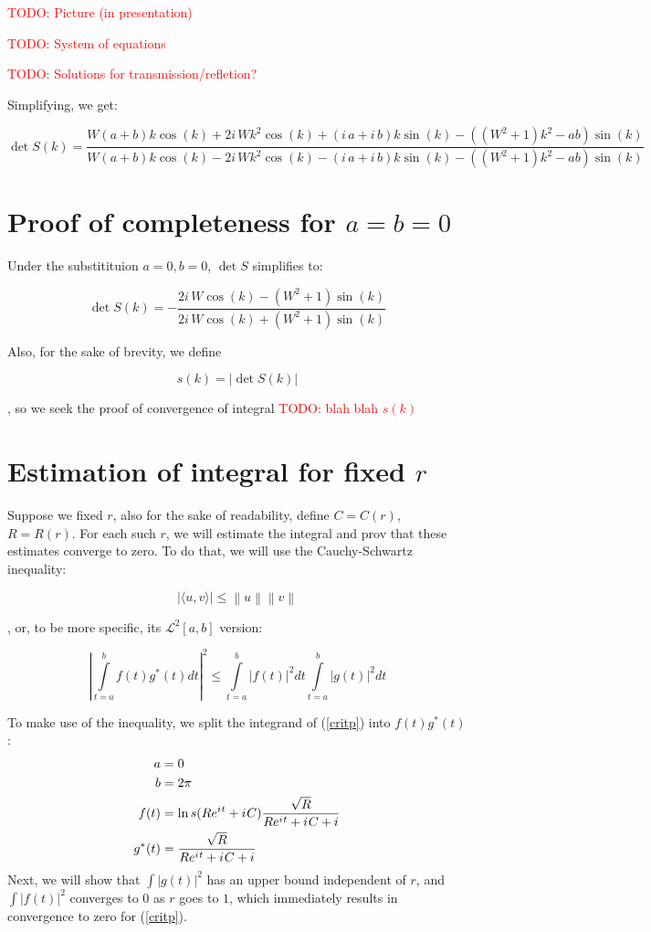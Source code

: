 \documentclass[12pt, a4paper]{article}
\newcommand{\abs}[1]{\left| #1 \right|}
\newcommand{\mcL}{\mathcal{L}}
\newcommand{\eexp}[1]{e^{#1}}
\newcommand{\iu}{{i\mkern1mu}}
\newcommand{\todo}[1]{{\large \textcolor{red}{TODO: #1}}}
\begin{document}
\todo{Picture (in presentation)}

\todo{System of equations}

\todo{Solutions for transmission/refletion?}

Simplifying, we get:

\[
\det S(k) = \frac{W {\left(a + b\right)} k \cos\left(k\right) + 2 i \, W k^{2} \cos\left(k\right) + {\left(i \, a + i \, b\right)} k \sin\left(k\right) - {\left({\left(W^{2} + 1\right)} k^{2} - a b\right)} \sin\left(k\right)}{W {\left(a + b\right)} k \cos\left(k\right) - 2 i \, W k^{2} \cos\left(k\right) - {\left(i \, a + i \, b\right)} k \sin\left(k\right) - {\left({\left(W^{2} + 1\right)} k^{2} - a b\right)} \sin\left(k\right)}
\]


\section{Proof of completeness for $a = b = 0$}
Under the substitituion $a = 0, b = 0$, $\det S$ simplifies to:

\[
\det S(k) = - \frac{2 i \, W \cos\left(k\right) - {\left(W^{2} + 1\right)} \sin\left(k\right)}{2 i \, W \cos\left(k\right) + {\left(W^{2} + 1\right)} \sin\left(k\right)}
\]

Also, for the sake of brevity, we define 

\[
s(k) = \abs{\det S(k)}
\]

, so we seek the proof of convergence of integral \todo{blah blah $s(k)$}


\section{Estimation of integral for fixed $r$}

Suppose we fixed $r$, also for the sake of readability, define $C = C(r)$, $R = R(r)$. For each such $r$, we will estimate the integral and prov that these estimates converge to zero. To do that, we will use the Cauchy-Schwartz inequality:

\[
\big| \langle u,v \rangle \big| \leq \left\|u\right\| \left\|v\right\|
\]

, or, to be more specific, its $\mcL^2[a, b]$ version:

\[
\abs{
\int\limits_{t=a}^{b} f(t) g^*(t) dt
}^2
\le
\int\limits_{t=a}^b \abs{f(t)}^2 dt 
\int\limits_{t=a}^b \abs{g(t)}^2 dt 
\]

To make use of the inequality, we split the integrand of (\ref{critp}) into $f(t) g^*(t)$:
\begin{align*}
a      &= 0 \\
b      &= 2 \pi \\
f(t)   &= \ln s(R \eexp{\iu t} + \iu C) \frac{\sqrt{R}}{R \eexp{\iu t} + \iu C + i} \\
g^*(t) &= \frac{\sqrt{R}}{R \eexp{\iu t} + \iu C + i}
\end{align*}
Next, we will show that $\int \abs{g(t)}^2$ has an upper bound independent of $r$, and $\int \abs{f(t)}^2$ converges to $0$ as $r$ goes to $1$, which immediately results in convergence to zero for (\ref{critp}).
\end{document}
